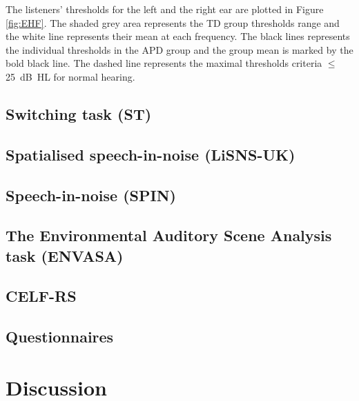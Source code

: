 \documentclass[a4paper,nobind]{templates/ociamthesis}
\begin{document}
The listeners' thresholds for the left and the right ear are plotted in Figure \ref{fig:EHF}. The shaded grey area represents the TD group thresholds range and the white line represents their mean at each frequency. The black lines represents the individual thresholds in the APD group and the group mean is marked by the bold black line. The dashed line represents the maximal thresholds criteria \(\leq\) 25~dB~HL for normal hearing.

\hypertarget{switching-task-st-1}{%
\subsection{Switching task (ST)}\label{switching-task-st-1}}

\hypertarget{spatialised-speech-in-noise-lisns-uk-1}{%
\subsection{Spatialised speech-in-noise (LiSNS-UK)}\label{spatialised-speech-in-noise-lisns-uk-1}}

\hypertarget{speech-in-noise-spin-1}{%
\subsection{Speech-in-noise (SPIN)}\label{speech-in-noise-spin-1}}

\hypertarget{the-environmental-auditory-scene-analysis-task-envasa-1}{%
\subsection{The Environmental Auditory Scene Analysis task (ENVASA)}\label{the-environmental-auditory-scene-analysis-task-envasa-1}}

\hypertarget{celf-rs-1}{%
\subsection{CELF-RS}\label{celf-rs-1}}

\hypertarget{questionnaires-1}{%
\subsection{Questionnaires}\label{questionnaires-1}}

\hypertarget{discussion}{%
\section{Discussion}\label{discussion}}
\end{document}
